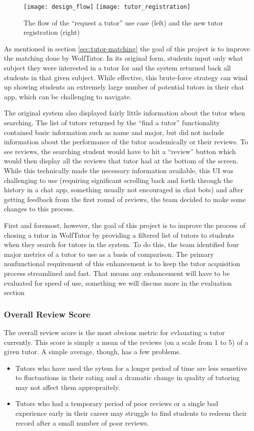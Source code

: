 \begin{figure*}[ht]
  \centering
    \texttt{[image: design\_flow]}
    \texttt{[image: tutor\_registration]}
    \caption{The flow of the ``request a tutor'' use case (left) and the new
      tutor registration (right)}
    \label{fig:scatterplot}
\end{figure*}
As mentioned in section \ref{sec:tutor-matching} the goal of this project is to
improve the matching done by WolfTutor. In its original form, students input
only what subject they were interested in a tutor for and the system returned
back all students in that given subject. While effective, this brute-force
strategy can wind up showing students an extremely large number of potential
tutors in their chat app, which can be challenging to navigate.

The original system also displayed fairly little information about the tutor
when searching. The list of tutors returned by the ``find a tutor''
functionality contained basic information such as name and major, but did not
include information about the performance of the tutor academically or their
reviews. To see reviews, the searching student would have to hit a ``review''
button which would then display all the reviews that tutor had at the bottom of
the screen. While this technically made the necessary information available,
this UI was challenging to use (requiring significant scrolling back and forth
through the history in a chat app, something usually not encouraged in chat
bots) and after getting feedback from the first round of reviews, the team
decided to make some changes to this process.

First and foremost, however, the goal of this project is to improve the process
of chosing a tutor in WolfTutor by providing a filtered list of tutors to
students when they search for tutors in the system. To do this, the team
identified four major metrics of a tutor to use as a basis of comparison. The
primary nonfunctional requirement of this enhancement is to keep the tutor
acquisition process streamlined and fast. That means any enhancement will have
to be evaluated for speed of use, something we will discuss more in the
evaluation section

\subsubsection{Overall Review Score}
The overall review score is the most obvious metric for evlauating a tutor
currently. This score is simply a mean of the reviews (on a scale from 1 to 5)
of a given tutor. A simple average, though, has a few problems.
\begin{itemize}
\item Tutors who have used the sytem for a longer period of time are less
  sensetive to fluctuations in their rating and a dramatic change in quality of
  tutoring may not affect them appropraitely.
\item Tutors who had a temporary period of poor reviews or a single bad
  experience early in their career may struggle to find students to redeem their
  record after a small number of poor reviews.
\end{itemize}

